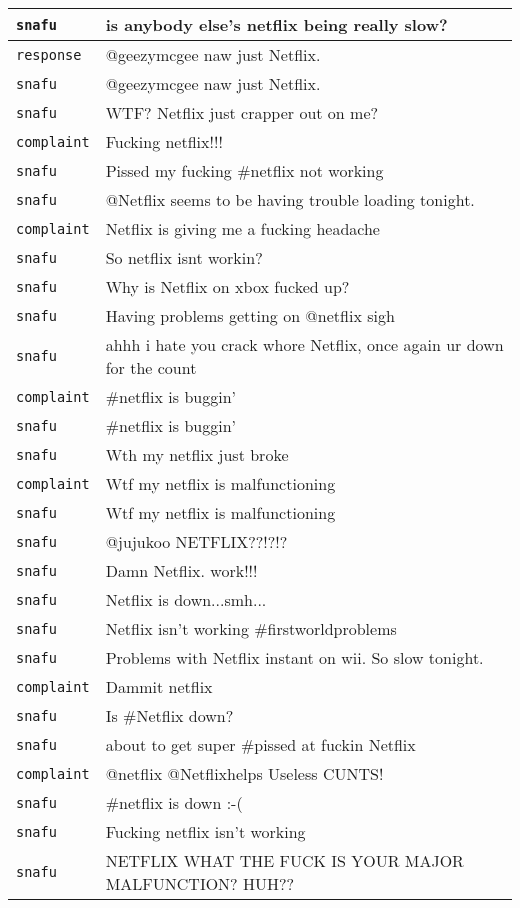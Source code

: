 \begin{center}
\begin{longtable}{|l|p{120mm}|}
      \tabularnewline\hline
         \texttt{snafu} & is anybody else's netflix being really slow?
      \tabularnewline\hline
         \texttt{response} & @geezymcgee naw just Netflix.
      \tabularnewline\hline
         \texttt{snafu} & @geezymcgee naw just Netflix.
      \tabularnewline\hline
         \texttt{snafu} & WTF? Netflix just crapper out on me?
      \tabularnewline\hline
         \texttt{complaint} & Fucking netflix!!!
      \tabularnewline\hline
         \texttt{snafu} & Pissed my fucking \#netflix not working
      \tabularnewline\hline
         \texttt{snafu} & @Netflix seems to be having trouble loading tonight.
      \tabularnewline\hline
         \texttt{complaint} & Netflix is giving me a fucking headache
      \tabularnewline\hline
         \texttt{snafu} & So netflix isnt workin?
      \tabularnewline\hline
         \texttt{snafu} & Why is Netflix on xbox fucked up?
      \tabularnewline\hline
         \texttt{snafu} & Having problems getting on @netflix sigh
      \tabularnewline\hline
         \texttt{snafu} & ahhh i hate you crack whore Netflix, once again ur down for the count
      \tabularnewline\hline
         \texttt{complaint} & \#netflix is buggin'
      \tabularnewline\hline
         \texttt{snafu} & \#netflix is buggin'
      \tabularnewline\hline
         \texttt{snafu} & Wth my netflix just broke
      \tabularnewline\hline
         \texttt{complaint} & Wtf my netflix is malfunctioning
      \tabularnewline\hline
         \texttt{snafu} & Wtf my netflix is malfunctioning
      \tabularnewline\hline
         \texttt{snafu} & @jujukoo NETFLIX??!?!?
      \tabularnewline\hline
         \texttt{snafu} & Damn Netflix. work!!!
      \tabularnewline\hline
         \texttt{snafu} & Netflix is down...smh...
      \tabularnewline\hline
         \texttt{snafu} & Netflix isn't working \#firstworldproblems
      \tabularnewline\hline
         \texttt{snafu} & Problems with Netflix instant on wii. So slow tonight.
      \tabularnewline\hline
         \texttt{complaint} & Dammit netflix
      \tabularnewline\hline
         \texttt{snafu} & Is \#Netflix down?
      \tabularnewline\hline
         \texttt{snafu} & about to get super \#pissed at fuckin Netflix
      \tabularnewline\hline
         \texttt{complaint} & @netflix @Netflixhelps Useless CUNTS!
      \tabularnewline\hline
         \texttt{snafu} & \#netflix is down :-(
      \tabularnewline\hline
         \texttt{snafu} & Fucking netflix isn't working
      \tabularnewline\hline
         \texttt{snafu} & NETFLIX WHAT THE FUCK IS YOUR MAJOR MALFUNCTION? HUH??
      \tabularnewline\hline

\end{longtable}
\end{center}

